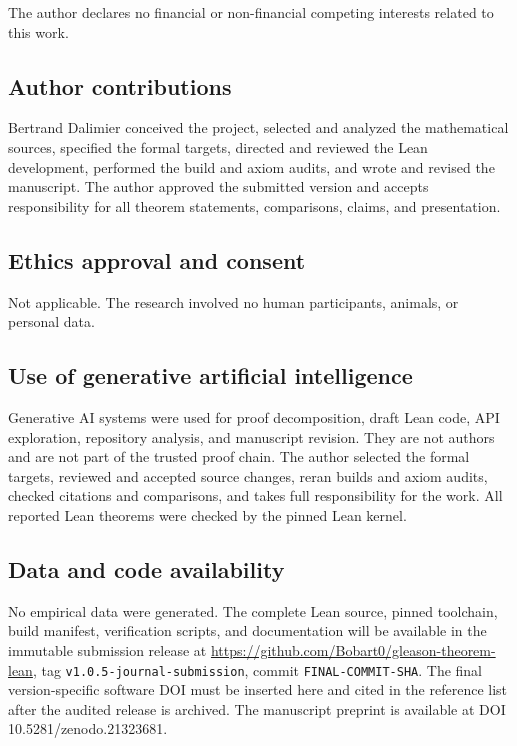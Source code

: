 \documentclass[pdflatex,sn-mathphys-num]{sn-jnl}
\providecommand{\passthrough}[1]{#1}
\theoremstyle{thmstyleone}
\theoremstyle{thmstylethree}
\begin{document}
The author declares no financial or non-financial competing interests related to this work.

\subsection*{Author contributions}

Bertrand Dalimier conceived the project, selected and analyzed the mathematical sources, specified the formal targets, directed and reviewed the Lean development, performed the build and axiom audits, and wrote and revised the manuscript. The author approved the submitted version and accepts responsibility for all theorem statements, comparisons, claims, and presentation.

\subsection*{Ethics approval and consent}

Not applicable. The research involved no human participants, animals, or personal data.

\subsection*{Use of generative artificial intelligence}

Generative AI systems were used for proof decomposition, draft Lean code, API exploration, repository analysis, and manuscript revision. They are not authors and are not part of the trusted proof chain. The author selected the formal targets, reviewed and accepted source changes, reran builds and axiom audits, checked citations and comparisons, and takes full responsibility for the work. All reported Lean theorems were checked by the pinned Lean kernel.

\subsection*{Data and code availability}

No empirical data were generated. The complete Lean source, pinned toolchain, build manifest, verification scripts, and documentation will be available in the immutable submission release \cite{dalimier2026} at \url{https://github.com/Bobart0/gleason-theorem-lean}, tag \passthrough{\lstinline!v1.0.5-journal-submission!}, commit \passthrough{\lstinline!FINAL-COMMIT-SHA!}. The final version-specific software DOI must be inserted here and cited in the reference list after the audited release is archived. The manuscript preprint is available at DOI 10.5281/zenodo.21323681.
\end{document}
